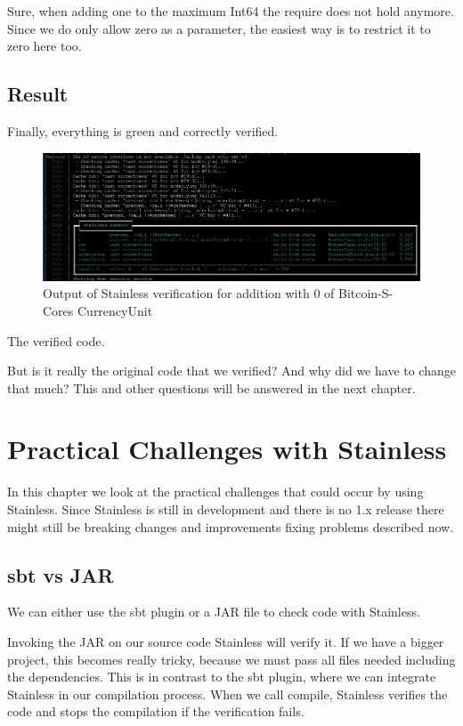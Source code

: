 \documentclass[runningheads]{llncs}
\begin{document}
Sure, when adding one to the maximum Int64 the require does not hold anymore.
Since we do only allow zero as a parameter, the easiest way is to restrict it to zero here too.


\subsection{Result}

Finally, everything is green and correctly verified.
\begin{figure}
	\centering
		\includegraphics[width=\textwidth]{final_verify_output}
	\caption{Output of Stainless verification for addition with 0 of Bitcoin-S-Cores CurrencyUnit}
\end{figure}

The verified code.


But is it really the original code that we verified?
And why did we have to change that much?
This and other questions will be answered in the next chapter.


\section{Practical Challenges with Stainless}
\label{chap:appendix_arb}

In this chapter we look at the practical challenges that could occur
by using Stainless.  Since Stainless is still in development and there
is no 1.x release there might still be breaking changes and
improvements fixing problems described now.


\subsection{sbt vs JAR}

We can either use the sbt plugin or a JAR file to check code with Stainless.

Invoking the JAR on our source code Stainless will verify it.  If we
have a bigger project, this becomes really tricky, because we must
pass all files needed including the dependencies.  This is in contrast
to the sbt plugin, where we can integrate Stainless in our compilation
process.  When we call compile, Stainless verifies the code and stops
the compilation if the verification fails.
\end{document}
